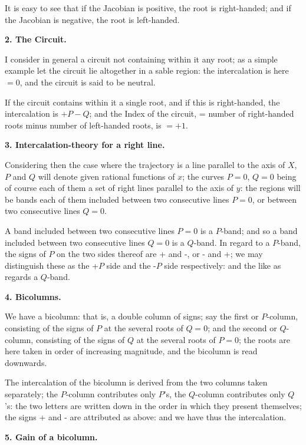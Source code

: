 \documentclass[11pt,a4paper]{book}
\begin{document}
It is easy to see that if the Jacobian is positive, the root is right-handed; and if the Jacobian is negative, the root is left-handed.

\textbf{2. The Circuit.}

I consider in general a circuit not containing within it any root; as a simple example let the circuit lie altogether in a sable region: the intercalation is here $= 0$, and the circuit is said to be neutral.

If the circuit contains within it a single root, and if this is right-handed, the intercalation is $+P - Q$; and the Index of the circuit, = number of right-handed roots minus number of left-handed roots, is $= +1$.

\newpage
\setcounter{page}{22}

\textbf{3. Intercalation-theory for a right line.}

Considering then the case where the trajectory is a line parallel to the axis of $X$, $P$ and $Q$ will denote given rational functions of $x$; the curves $P = 0$, $Q = 0$ being of course each of them a set of right lines parallel to the axis of $y$: the regions will be bands each of them included between two consecutive lines $P = 0$, or between two consecutive lines $Q = 0$.

A band included between two consecutive lines $P = 0$ is a $P$-band; and so a band included between two consecutive lines $Q = 0$ is a $Q$-band. In regard to a $P$-band, the signs of $P$ on the two sides thereof are + and -, or - and +; we may distinguish these as the +$P$ side and the -$P$ side respectively: and the like as regards a $Q$-band.

\textbf{4. Bicolumns.}

We have a bicolumn: that is, a double column of signs; say the first or $P$-column, consisting of the signs of $P$ at the several roots of $Q = 0$; and the second or $Q$-column, consisting of the signs of $Q$ at the several roots of $P = 0$; the roots are here taken in order of increasing magnitude, and the bicolumn is read downwards.

The intercalation of the bicolumn is derived from the two columns taken separately; the $P$-column contributes only $P$'s, the $Q$-column contributes only $Q$'s: the two letters are written down in the order in which they present themselves; the signs + and - are attributed as above: and we have thus the intercalation.

\newpage
\setcounter{page}{23}

\textbf{5. Gain of a bicolumn.}
\end{document}
